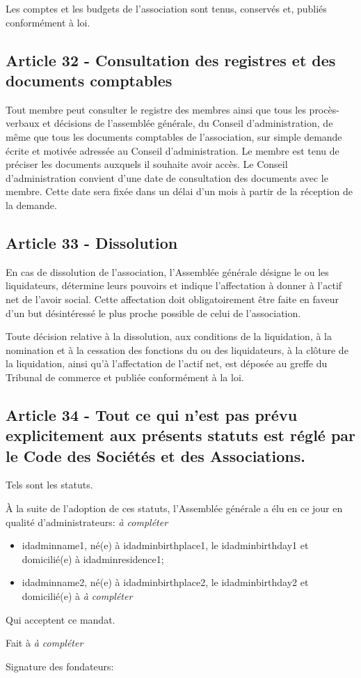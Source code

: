 \documentclass[12pt]{article}
\begin{document}
Les comptes et les budgets de l'association sont tenus, conservés et, publiés conformément à loi.

\subsection*{Article 32 - Consultation des registres et des documents comptables}
Tout membre peut consulter le registre des membres ainsi que tous les procès-verbaux et décisions de l'assemblée générale, du Conseil d'administration, de même que tous les documents comptables de l'association, sur simple demande écrite et motivée adressée au Conseil d'administration. Le membre est tenu de préciser les documents auxquels il souhaite avoir accès. Le Conseil d'administration convient d'une date de consultation des documents avec le membre. Cette date sera fixée dans un délai d'un mois à partir de la réception de la demande.
\subsection*{Article 33 - Dissolution}
En cas de dissolution de l'association, l'Assemblée générale désigne le ou les liquidateurs, détermine leurs pouvoirs et indique l'affectation à donner à l'actif net de l'avoir social. Cette affectation doit obligatoirement être faite en faveur d'un but désintéressé le plus proche possible de celui de l'association.

Toute décision relative à la dissolution, aux conditions de la liquidation, à la nomination et à la cessation des fonctions du ou des liquidateurs, à la clôture de la liquidation, ainsi qu'à l'affectation de l'actif net, est déposée au greffe du Tribunal de commerce et publiée conformément à la loi.

\subsection*{Article 34 - Tout ce qui n'est pas prévu explicitement aux présents statuts est réglé par le Code des Sociétés et des Associations.}

Tels sont les statuts.

À la suite de l'adoption de ces statuts, l'Assemblée générale a élu en ce jour en qualité d'administrateurs:
\emph{à compléter}

\begin{itemize}
\item idadminname1, né(e) à idadminbirthplace1, le idadminbirthday1 et domicilié(e) à idadminresidence1;

\item idadminname2, né(e) à idadminbirthplace2, le idadminbirthday2 et domicilié(e) à \emph{à compléter}
\end{itemize}

Qui acceptent ce mandat.

Fait à \emph{à compléter}

Signature des fondateurs:
\end{document}
